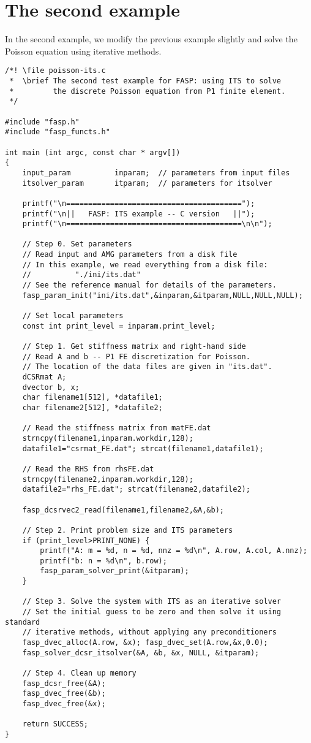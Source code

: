 \documentclass[11pt]{memoir}
\begin{document}
\section{The second example}\label{sec:ex2}

In the second example, we modify the previous example slightly and solve the Poisson equation using iterative methods.

\begin{lstlisting}[stepnumber=1,firstnumber=1]
/*! \file poisson-its.c
 *  \brief The second test example for FASP: using ITS to solve
 *         the discrete Poisson equation from P1 finite element.
 */

#include "fasp.h"
#include "fasp_functs.h"

int main (int argc, const char * argv[])
{
    input_param          inparam;  // parameters from input files
    itsolver_param       itparam;  // parameters for itsolver

    printf("\n========================================");
    printf("\n||   FASP: ITS example -- C version   ||");
    printf("\n========================================\n\n");

    // Step 0. Set parameters
    // Read input and AMG parameters from a disk file
    // In this example, we read everything from a disk file:
    //          "./ini/its.dat"
    // See the reference manual for details of the parameters.
    fasp_param_init("ini/its.dat",&inparam,&itparam,NULL,NULL,NULL);

    // Set local parameters
    const int print_level = inparam.print_level;

    // Step 1. Get stiffness matrix and right-hand side
    // Read A and b -- P1 FE discretization for Poisson.
    // The location of the data files are given in "its.dat".
    dCSRmat A;
    dvector b, x;
    char filename1[512], *datafile1;
    char filename2[512], *datafile2;

    // Read the stiffness matrix from matFE.dat
    strncpy(filename1,inparam.workdir,128);
    datafile1="csrmat_FE.dat"; strcat(filename1,datafile1);

    // Read the RHS from rhsFE.dat
    strncpy(filename2,inparam.workdir,128);
    datafile2="rhs_FE.dat"; strcat(filename2,datafile2);

    fasp_dcsrvec2_read(filename1,filename2,&A,&b);

    // Step 2. Print problem size and ITS parameters
    if (print_level>PRINT_NONE) {
        printf("A: m = %d, n = %d, nnz = %d\n", A.row, A.col, A.nnz);
        printf("b: n = %d\n", b.row);
        fasp_param_solver_print(&itparam);
    }

    // Step 3. Solve the system with ITS as an iterative solver
    // Set the initial guess to be zero and then solve it using standard
    // iterative methods, without applying any preconditioners
    fasp_dvec_alloc(A.row, &x); fasp_dvec_set(A.row,&x,0.0);
    fasp_solver_dcsr_itsolver(&A, &b, &x, NULL, &itparam);

    // Step 4. Clean up memory
    fasp_dcsr_free(&A);
    fasp_dvec_free(&b);
    fasp_dvec_free(&x);

    return SUCCESS;
}
\end{lstlisting}
\end{document}

